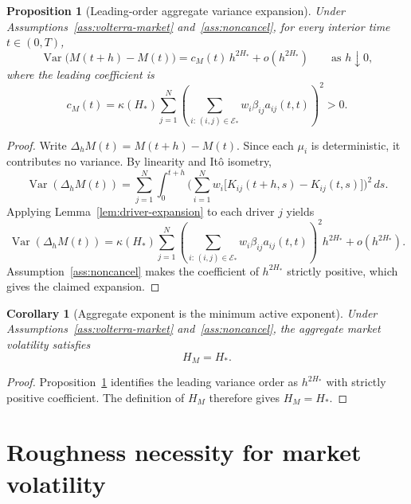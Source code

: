 \documentclass[11pt,a4paper]{amsart}
\theoremstyle{plain}
\newtheorem{proposition}[theorem]{Proposition}
\newtheorem{corollary}[theorem]{Corollary}
\theoremstyle{definition}
\theoremstyle{remark}
\DeclareMathOperator{\Var}{Var}
\newcommand{\dd}{\,d}
\newcommand{\cE}{\mathcal{E}}
\begin{document}
\begin{proposition}[Leading-order aggregate variance expansion]\label{prop:aggregate-leading}
Under Assumptions~\ref{ass:volterra-market} and~\ref{ass:noncancel}, for every interior time
\(t\in(0,T)\),
\[
        \Var\bigl(M(t+h)-M(t)\bigr)
        =
        c_M(t)\,h^{2H_*}
        +o(h^{2H_*})
        \qquad
        \text{as } h\downarrow0,
\]
where the leading coefficient is
\[
        c_M(t)
        =
        \kappa(H_*)
        \sum_{j=1}^N
        \left(
        \sum_{i:\,(i,j)\in\cE_*}
        w_i\beta_{ij}a_{ij}(t,t)
        \right)^2
        >0.
\]
\end{proposition}

\begin{proof}
Write \(\Delta_h M(t)=M(t+h)-M(t)\).  Since each \(\mu_i\) is deterministic, it contributes no
variance.  By linearity and It\^o isometry,
\[
        \Var(\Delta_h M(t))
        =
        \sum_{j=1}^N
        \int_0^{t+h}
        \Biggl(
        \sum_{i=1}^N
        w_i\bigl[K_{ij}(t+h,s)-K_{ij}(t,s)\bigr]
        \Biggr)^2
        \dd s.
\]
Applying Lemma~\ref{lem:driver-expansion} to each driver \(j\) yields
\[
        \Var(\Delta_h M(t))
        =
        \kappa(H_*)
        \sum_{j=1}^N
        \left(
        \sum_{i:\,(i,j)\in\cE_*}
        w_i\beta_{ij}a_{ij}(t,t)
        \right)^2
        h^{2H_*}
        +
        o(h^{2H_*}).
\]
Assumption~\ref{ass:noncancel} makes the coefficient of \(h^{2H_*}\) strictly positive, which gives
the claimed expansion.
\end{proof}

\begin{corollary}[Aggregate exponent is the minimum active exponent]\label{cor:aggregate-min}
Under Assumptions~\ref{ass:volterra-market} and~\ref{ass:noncancel}, the aggregate market
volatility satisfies
\[
        H_M
        =
        H_*.
\]
\end{corollary}

\begin{proof}
Proposition~\ref{prop:aggregate-leading} identifies the leading variance order as
\(h^{2H_*}\) with strictly positive coefficient.  The definition of \(H_M\) therefore gives
\(H_M=H_*\).
\end{proof}

\section{Roughness necessity for market volatility}\label{sec:roughness}
\end{document}
